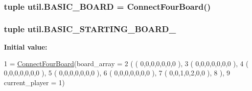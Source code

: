 \subsubsection[{B\+A\+S\+I\+C\+\_\+\+B\+O\+A\+R\+D}]{\setlength{\rightskip}{0pt plus 5cm}tuple util.\+B\+A\+S\+I\+C\+\_\+\+B\+O\+A\+R\+D = {\bf Connect\+Four\+Board}()}\label{namespaceutil_a10b9210601911f13607868bf248c4f6c}
\hypertarget{namespaceutil_aecf4927bd0b242a8302cb1c60cc19af5}{}
\subsubsection[{B\+A\+S\+I\+C\+\_\+\+S\+T\+A\+R\+T\+I\+N\+G\+\_\+\+B\+O\+A\+R\+D\+\_\+1}]{\setlength{\rightskip}{0pt plus 5cm}tuple util.\+B\+A\+S\+I\+C\+\_\+\+S\+T\+A\+R\+T\+I\+N\+G\+\_\+\+B\+O\+A\+R\+D\+\_}\label{namespaceutil_aecf4927bd0b242a8302cb1c60cc19af5}
{\bfseries Initial value\+:}
\begin{DoxyCode}
1 = \hyperlink{classconnectfour_1_1_connect_four_board}{ConnectFourBoard}(board\_array =
2                                           ( ( 0,0,0,0,0,0,0 ),
3                                             ( 0,0,0,0,0,0,0 ),
4                                             ( 0,0,0,0,0,0,0 ),
5                                             ( 0,0,0,0,0,0,0 ),
6                                             ( 0,0,0,0,0,0,0 ),
7                                             ( 0,0,1,0,2,0,0 ),
8                                             ),
9                                           current\_player = 1)
\end{DoxyCode}
\hypertarget{namespaceutil_a70ced14d7bb5c7b954153b6b13c45781}{}
